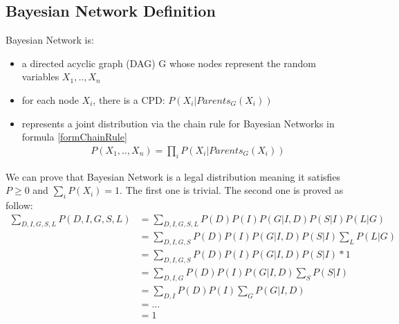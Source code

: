 \subsection{Bayesian Network Definition}
Bayesian Network is:
\begin{itemize}
	\item a directed acyclic graph (DAG) G whose nodes represent the random variables $X_1,..,X_n$
	\item for each node $X_i$, there is a CPD: $P(X_i | Parents_G(X_i))$
	\item represents a joint distribution via the chain rule for Bayesian Networks in formula \ref{formChainRule} 
	\begin{align}\label{formChainRule}
	P(X_1,..,X_n) = \prod_i P(X_i|Parents_G(X_i))
	\end{align}
\end{itemize}
We can prove that Bayesian Network is a legal distribution meaning it satisfies $P \geq 0$ and $\sum_i P(X_i) = 1$. The first one is trivial. The second one is proved as follow:
\begin{align*}
\sum_{D,I,G,S,L} P(D,I,G,S,L) 	&= \sum_{D,I,G,S,L} P(D)P(I)P(G|I,D)P(S|I)P(L|G) \\
								&= \sum_{D,I,G,S} P(D)P(I)P(G|I,D)P(S|I) \sum_L P(L|G) \\
								&= \sum_{D,I,G,S} P(D)P(I)P(G|I,D)P(S|I) * 1\\
								&= \sum_{D,I,G} P(D)P(I)P(G|I,D) \sum_S P(S|I)\\
								&= \sum_{D,I} P(D)P(I) \sum_G P(G|I,D)\\
								&= ...\\
								&= 1
\end{align*}
